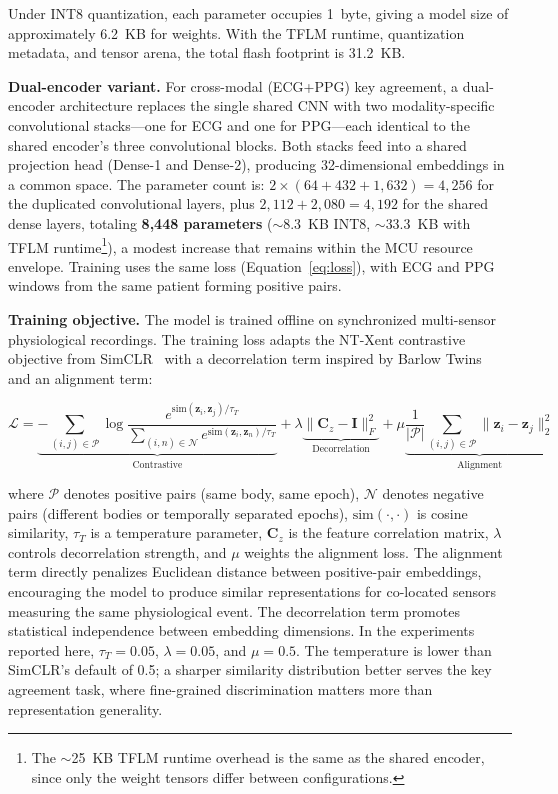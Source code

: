 \documentclass[sensors,article,submit,pdftex,moreauthors]{Definitions/mdpi}
\begin{document}
Under INT8 quantization, each parameter occupies 1~byte, giving a model size of approximately 6.2~KB for weights. With the TFLM runtime, quantization metadata, and tensor arena, the total flash footprint is 31.2~KB.

\textbf{Dual-encoder variant.} For cross-modal (ECG+PPG) key agreement, a dual-encoder architecture replaces the single shared CNN with two modality-specific convolutional stacks---one for ECG and one for PPG---each identical to the shared encoder's three convolutional blocks. Both stacks feed into a shared projection head (Dense-1 and Dense-2), producing 32-dimensional embeddings in a common space. The parameter count is: $2 \times (64 + 432 + 1{,}632) = 4{,}256$ for the duplicated convolutional layers, plus $2{,}112 + 2{,}080 = 4{,}192$ for the shared dense layers, totaling \textbf{8{,}448 parameters} ($\sim$8.3~KB INT8, $\sim$33.3~KB with TFLM runtime\footnote{The $\sim$25~KB TFLM runtime overhead is the same as the shared encoder, since only the weight tensors differ between configurations.}), a modest increase that remains within the MCU resource envelope. Training uses the same loss (Equation~\ref{eq:loss}), with ECG and PPG windows from the same patient forming positive pairs.

\textbf{Training objective.} The model is trained offline on synchronized multi-sensor physiological recordings. The training loss adapts the NT-Xent contrastive objective from SimCLR~\cite{chen2020simclr} with a decorrelation term inspired by Barlow Twins~\cite{zbontar2021barlow} and an alignment term:

\begin{equation}
\label{eq:loss}
\mathcal{L} = \underbrace{-\sum_{(i,j) \in \mathcal{P}} \log \frac{e^{\text{sim}(\mathbf{z}_i, \mathbf{z}_j)/\tau_T}}{\sum_{(i,n) \in \mathcal{N}} e^{\text{sim}(\mathbf{z}_i, \mathbf{z}_n)/\tau_T}}}_{\text{Contrastive}} + \lambda \underbrace{\|\mathbf{C}_z - \mathbf{I}\|_F^2}_{\text{Decorrelation}} + \mu \underbrace{\frac{1}{|\mathcal{P}|}\sum_{(i,j) \in \mathcal{P}} \|\mathbf{z}_i - \mathbf{z}_j\|_2^2}_{\text{Alignment}}
\end{equation}

where $\mathcal{P}$ denotes positive pairs (same body, same epoch), $\mathcal{N}$ denotes negative pairs (different bodies or temporally separated epochs), $\text{sim}(\cdot, \cdot)$ is cosine similarity, $\tau_T$ is a temperature parameter, $\mathbf{C}_z$ is the feature correlation matrix, $\lambda$ controls decorrelation strength, and $\mu$ weights the alignment loss. The alignment term directly penalizes Euclidean distance between positive-pair embeddings, encouraging the model to produce similar representations for co-located sensors measuring the same physiological event. The decorrelation term promotes statistical independence between embedding dimensions. In the experiments reported here, $\tau_T = 0.05$, $\lambda = 0.05$, and $\mu = 0.5$. The temperature is lower than SimCLR's default of 0.5; a sharper similarity distribution better serves the key agreement task, where fine-grained discrimination matters more than representation generality.
\end{document}

